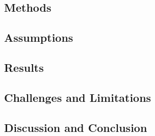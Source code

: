 \documentclass[10pt,]{article}
\begin{document}
\subsection{Methods}\label{methods}

\subsection{Assumptions}\label{assumptions}

\subsection{Results}\label{results}

\subsection{Challenges and
Limitations}\label{challenges-and-limitations}

\subsection{Discussion and Conclusion}\label{discussion-and-conclusion}
\end{document}
